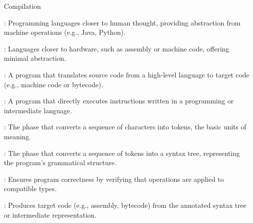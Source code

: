 \documentclass[hidelinks]{article}
\begin{document}
\begin{smodule}[title={Compilation Phases}]{Compilation}
    \begin{sdefinition}[for=HighLevelLanguage]
        : Programming languages closer to human thought, providing abstraction from machine operations (e.g., Java, Python).
    \end{sdefinition}
    
    \begin{sdefinition}[for=LowLevelLanguage]
        : Languages closer to hardware, such as assembly or machine code, offering minimal abstraction.
    \end{sdefinition}
    
    \begin{sdefinition}[for=Compiler]
        : A program that translates source code from a high-level language to target code (e.g., machine code or bytecode).
    \end{sdefinition}
    
    \begin{sdefinition}[for=Interpreter]
        : A program that directly executes instructions written in a programming or intermediate language.
    \end{sdefinition}
    
    \begin{sdefinition}[for=Lexing]
        : The phase that converts a sequence of characters into tokens, the basic units of meaning.
    \end{sdefinition}
    
    \begin{sdefinition}[for=Parsing]
        : The phase that converts a sequence of tokens into a syntax tree, representing the program's grammatical structure.
    \end{sdefinition}
    
    \begin{sdefinition}[for=TypeChecking]
        : Ensures program correctness by verifying that operations are applied to compatible types.
    \end{sdefinition}
    
    \begin{sdefinition}[for=CodeGeneration]
        : Produces target code (e.g., assembly, bytecode) from the annotated syntax tree or intermediate representation.
    \end{sdefinition}
    

\end{smodule}
\end{document}
